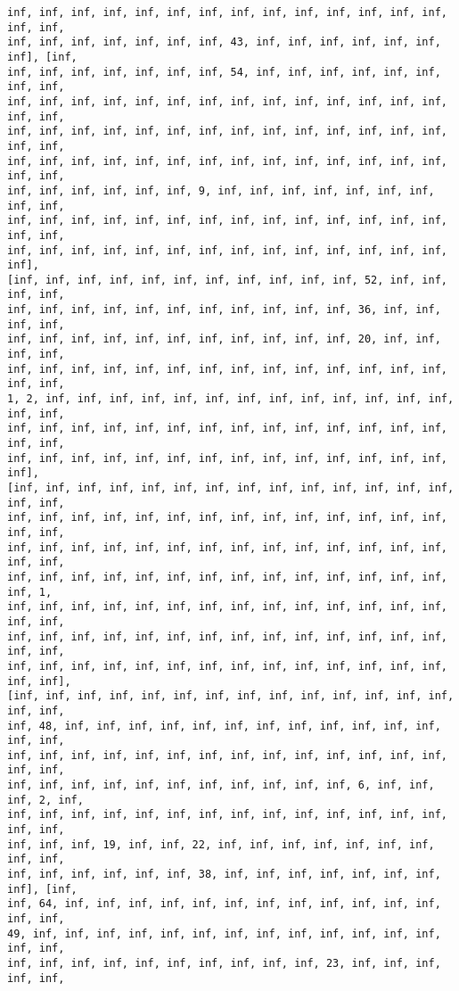 \documentclass[11pt]{article}
\begin{document}
\begin{Verbatim}[commandchars=\\\{\}]
inf, inf, inf, inf, inf, inf, inf, inf, inf, inf, inf, inf, inf, inf, inf, inf,
inf, inf, inf, inf, inf, inf, inf, 43, inf, inf, inf, inf, inf, inf, inf], [inf,
inf, inf, inf, inf, inf, inf, inf, 54, inf, inf, inf, inf, inf, inf, inf, inf,
inf, inf, inf, inf, inf, inf, inf, inf, inf, inf, inf, inf, inf, inf, inf, inf,
inf, inf, inf, inf, inf, inf, inf, inf, inf, inf, inf, inf, inf, inf, inf, inf,
inf, inf, inf, inf, inf, inf, inf, inf, inf, inf, inf, inf, inf, inf, inf, inf,
inf, inf, inf, inf, inf, inf, 9, inf, inf, inf, inf, inf, inf, inf, inf, inf,
inf, inf, inf, inf, inf, inf, inf, inf, inf, inf, inf, inf, inf, inf, inf, inf,
inf, inf, inf, inf, inf, inf, inf, inf, inf, inf, inf, inf, inf, inf, inf],
[inf, inf, inf, inf, inf, inf, inf, inf, inf, inf, inf, 52, inf, inf, inf, inf,
inf, inf, inf, inf, inf, inf, inf, inf, inf, inf, inf, 36, inf, inf, inf, inf,
inf, inf, inf, inf, inf, inf, inf, inf, inf, inf, inf, 20, inf, inf, inf, inf,
inf, inf, inf, inf, inf, inf, inf, inf, inf, inf, inf, inf, inf, inf, inf, inf,
1, 2, inf, inf, inf, inf, inf, inf, inf, inf, inf, inf, inf, inf, inf, inf, inf,
inf, inf, inf, inf, inf, inf, inf, inf, inf, inf, inf, inf, inf, inf, inf, inf,
inf, inf, inf, inf, inf, inf, inf, inf, inf, inf, inf, inf, inf, inf, inf],
[inf, inf, inf, inf, inf, inf, inf, inf, inf, inf, inf, inf, inf, inf, inf, inf,
inf, inf, inf, inf, inf, inf, inf, inf, inf, inf, inf, inf, inf, inf, inf, inf,
inf, inf, inf, inf, inf, inf, inf, inf, inf, inf, inf, inf, inf, inf, inf, inf,
inf, inf, inf, inf, inf, inf, inf, inf, inf, inf, inf, inf, inf, inf, inf, 1,
inf, inf, inf, inf, inf, inf, inf, inf, inf, inf, inf, inf, inf, inf, inf, inf,
inf, inf, inf, inf, inf, inf, inf, inf, inf, inf, inf, inf, inf, inf, inf, inf,
inf, inf, inf, inf, inf, inf, inf, inf, inf, inf, inf, inf, inf, inf, inf, inf],
[inf, inf, inf, inf, inf, inf, inf, inf, inf, inf, inf, inf, inf, inf, inf, inf,
inf, 48, inf, inf, inf, inf, inf, inf, inf, inf, inf, inf, inf, inf, inf, inf,
inf, inf, inf, inf, inf, inf, inf, inf, inf, inf, inf, inf, inf, inf, inf, inf,
inf, inf, inf, inf, inf, inf, inf, inf, inf, inf, inf, 6, inf, inf, inf, 2, inf,
inf, inf, inf, inf, inf, inf, inf, inf, inf, inf, inf, inf, inf, inf, inf, inf,
inf, inf, inf, 19, inf, inf, 22, inf, inf, inf, inf, inf, inf, inf, inf, inf,
inf, inf, inf, inf, inf, inf, 38, inf, inf, inf, inf, inf, inf, inf, inf], [inf,
inf, 64, inf, inf, inf, inf, inf, inf, inf, inf, inf, inf, inf, inf, inf, inf,
49, inf, inf, inf, inf, inf, inf, inf, inf, inf, inf, inf, inf, inf, inf, inf,
inf, inf, inf, inf, inf, inf, inf, inf, inf, inf, 23, inf, inf, inf, inf, inf,

\end{Verbatim}
\end{document}
